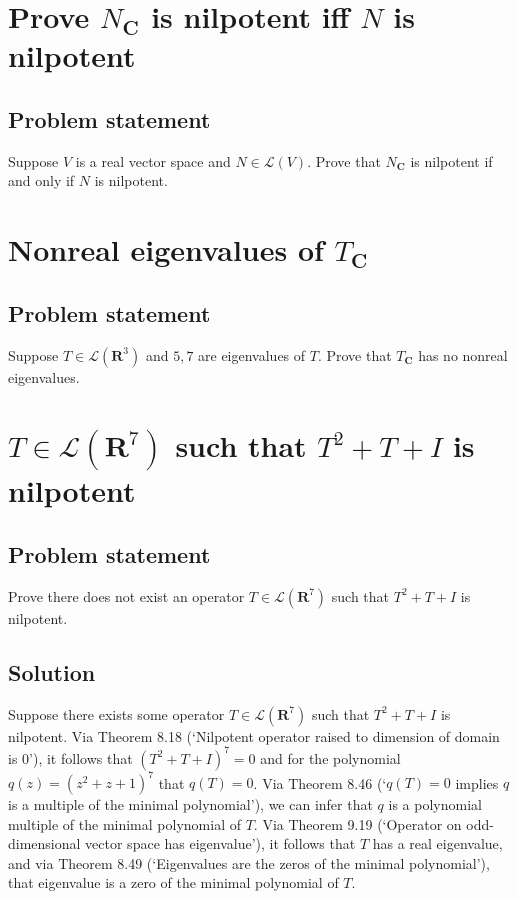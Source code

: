 \documentclass{article}
\begin{document}
\section{Prove $N_{\mathbf{C}}$ is nilpotent iff $N$ is nilpotent}
\subsection*{Problem statement}
Suppose $V$ is a real vector space and $N\in\mathcal{L}(V)$. Prove that $N_{\mathbf{C}}$ is nilpotent if and only if $N$ is nilpotent.

\clearpage

\section{Nonreal eigenvalues of $T_{\mathbf{C}}$}
\subsection*{Problem statement}
Suppose $T\in\mathcal{L}(\mathbf{R}^3)$ and $5,7$ are eigenvalues of $T$. Prove that $T_{\mathbf{C}}$ has no nonreal eigenvalues.

\clearpage

\section{$T\in\mathcal{L}(\mathbf{R}^7)$ such that $T^2+T+I$ is nilpotent}
\subsection*{Problem statement}
Prove there does not exist an operator $T\in\mathcal{L}(\mathbf{R}^7)$ such that $T^2+T+I$ is nilpotent.

\subsection*{Solution}
Suppose there exists some operator $T\in\mathcal{L}(\mathbf{R}^7)$ such that $T^2+T+I$ is nilpotent. Via Theorem 8.18 (`Nilpotent operator raised to dimension of domain is $0$'), it follows that $(T^2+T+I)^7=0$ and for the polynomial $q(z)=(z^2+z+1)^7$ that $q(T)=0$. Via Theorem 8.46 (`$q(T)=0$ implies $q$ is a multiple of the minimal polynomial'), we can infer that $q$ is a polynomial multiple of the minimal polynomial of $T$. Via Theorem 9.19 (`Operator on odd-dimensional vector space has eigenvalue'), it follows that $T$ has a real eigenvalue, and via Theorem 8.49 (`Eigenvalues are the zeros of the minimal polynomial'), that eigenvalue is a zero of the minimal polynomial of $T$.
\end{document}
